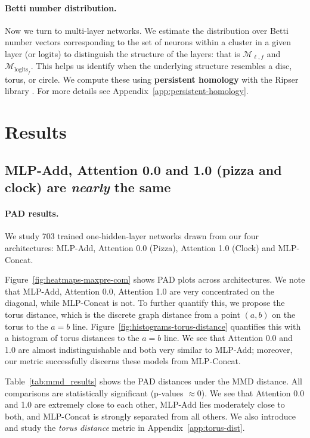 \documentclass{article} %
\theoremstyle{plain}
\theoremstyle{definition}
\newtheorem{empirical fact}[theorem]{Empirical Fact}
\begin{document}
\paragraph{\textbf{Betti number distribution.}} Now we turn to multi-layer networks. We estimate the distribution over Betti number vectors corresponding to the set of neurons within a cluster in a given layer (or logits) to distinguish the structure of the layers: that is $\mathcal{M}_{\ell,f}$ and $\mathcal{M}_{\text{logits}_f}$. This helps us identify when the underlying structure resembles a disc, torus, or circle. We compute these using \textbf{persistent homology} with the Ripser library \citep{Bauer2021Ripser, de_Silva_2011, ctralie2018ripser}. For more details see Appendix~\ref{app:persistent-homology}. 


\section{Results}\label{sec:results}


\subsection{MLP-Add, Attention 0.0 and 1.0 (pizza and clock) are \emph{nearly} the same}

\paragraph{\textbf{PAD results.}} We study 703 trained one-hidden-layer networks drawn from our four architectures: MLP-Add, Attention 0.0 (Pizza), Attention 1.0 (Clock) and MLP-Concat. 

Figure~\ref{fig:heatmaps-maxpre-com} shows PAD plots across architectures. We note that MLP-Add, Attention 0.0, Attention 1.0 are very concentrated on the diagonal, while MLP-Concat is not. To further quantify this, we propose the torus distance, which is the discrete graph distance from a point $(a,b)$ on the torus to the $a=b$ line. Figure~\ref{fig:histograms-torus-distance} quantifies this with a histogram of torus distances to the $a=b$ line. We see that Attention 0.0 and 1.0 are almost indistinguishable and both very similar to MLP-Add; moreover, our metric successfully discerns these models from MLP-Concat.

Table~\ref{tab:mmd_results} shows the PAD distances under the MMD distance. All comparisons are statistically significant (p-values $\approx 0$). We see that Attention 0.0 and 1.0 are extremely close to each other, MLP-Add lies moderately close to both, and MLP-Concat is strongly separated from all others. We also introduce and study the \textit{torus distance} metric in Appendix~\ref{app:torus-dist}.
\end{document}

